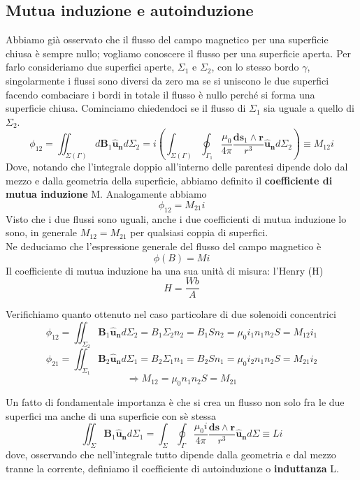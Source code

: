 \documentclass[
10pt, %
a4paper, %
oneside, %
headinclude,footinclude, %
BCOR5mm, %
]{scrartcl}
\begin{document}
\subsection{Mutua induzione e autoinduzione}
Abbiamo già osservato che il flusso del campo magnetico per una superficie chiusa è sempre nullo; vogliamo conoscere il flusso per una superficie aperta. Per farlo consideriamo due superfici aperte, $\Sigma_1$ e $\Sigma_2$, con lo stesso bordo $\gamma$, singolarmente i flussi sono diversi da zero ma se si uniscono le due superfici facendo combaciare i bordi in totale il flusso è nullo perché si forma una superficie chiusa. Cominciamo chiedendoci se il flusso di $\Sigma_1$ sia uguale a quello di $\Sigma_2$.
\[\phi_{12} = \iint_{\Sigma(\Gamma)}d\mathbf{B}_1\mathbf{\hat{u}_n}d\Sigma_2= i\left(\int_{\Sigma(\Gamma)}\oint_{\Gamma_1}\frac{\mu_0 }{4\pi}\frac{\mathbf{ds}_1\wedge\mathbf{r}}{r^3}\mathbf{\hat{u}_n}d\Sigma_2\right)\equiv M_{12}i\]
Dove, notando che l'integrale doppio all'interno delle parentesi dipende dolo dal mezzo e dalla geometria della superficie, abbiamo definito il \textbf{coefficiente di mutua induzione} M.
Analogamente abbiamo
\[\phi_{12}= M_{21}i\]
Visto che i due flussi sono uguali, anche i due coefficienti di mutua induzione lo sono, in generale \(M_{12}=M_{21}\) per qualsiasi coppia di superfici.\\
Ne deduciamo che l'espressione generale del flusso del campo magnetico è
\[\phi(B) = M i\]
Il coefficiente di mutua induzione ha una sua unità di misura: l'Henry (H)
\[H = \frac{Wb}{A}\]
\begin{esercizio}
Verifichiamo quanto ottenuto nel caso particolare di due solenoidi concentrici
\[\phi_{12}=\iint_{\Sigma_2}\mathbf{B}_1\mathbf{\hat{u}_n}d\Sigma_2 = B_1\Sigma_2 n_2=B_1 S n_2 = \mu_0 i_1 n_1 n_2 S = M_{12}i_1\]
\[\phi_{21}=\iint_{\Sigma_1}\mathbf{B}_2\mathbf{\hat{u}_n}d\Sigma_1 = B_2\Sigma_1 n_1=B_2 S n_1 = \mu_0 i_2 n_1 n_2 S = M_{21}i_2\]
\[\Rightarrow M_{12}=\mu_0 n_1 n_2 S=M_{21}\]
\end{esercizio}
Un fatto di fondamentale importanza è che si crea un flusso non solo fra le due superfici ma anche di una superficie con sè stessa
\[\iint_{\Sigma}\mathbf{B}_1\mathbf{\hat{u}_n}d\Sigma_1 = \int_{\Sigma}\oint_{\Gamma}\frac{\mu_0 i }{4\pi}\frac{\mathbf{ds}\wedge\mathbf{r}}{r^3}\mathbf{\hat{u}_n}d\Sigma\equiv L i\]
dove, osservando che nell'integrale tutto dipende dalla geometria e dal mezzo tranne la corrente, definiamo il coefficiente di autoinduzione o \textbf{induttanza} L.
\end{document}
